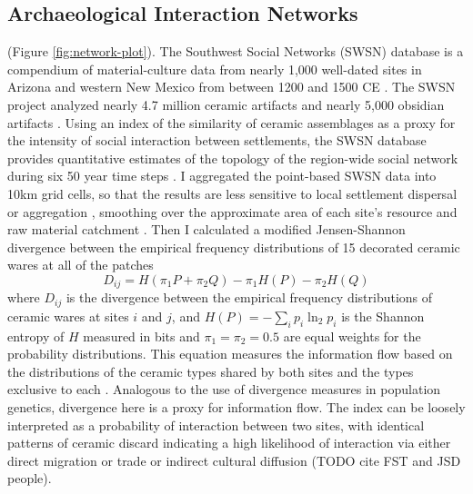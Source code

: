 \documentclass[10pt]{iopart}
\begin{document}
\subsection*{Archaeological Interaction Networks}
(Figure \ref{fig:network-plot}). The Southwest Social Networks (SWSN) database is a compendium of material-culture data from nearly 1,000 well-dated sites in Arizona and western New Mexico from between 1200 and 1500 CE \parencite{Mills2012,Mills2013a,Peeples2013,Borck2015,Hill2015,Mills2015a}. The SWSN project analyzed nearly 4.7 million ceramic artifacts and nearly 5,000 obsidian artifacts \parencite{Mills2015a}. Using an index of the similarity of ceramic assemblages as a proxy for the intensity of social interaction between settlements, the SWSN database provides quantitative estimates of the topology of the region-wide social network during six 50 year time steps \parencite{Mills2013a}. I aggregated the point-based SWSN data into 10km grid cells, so that the results are less sensitive to local settlement dispersal or aggregation \parencite{Paliou2016}, smoothing over the approximate area of each site's resource and raw material catchment \parencite{Varien1999}. Then I calculated a modified Jensen-Shannon divergence between the empirical frequency distributions of 15 decorated ceramic wares at all of the patches
\begin{equation}
    D_{ij} = H\left(\pi_1P + \pi_2Q\right) - \pi_1H(P) - \pi_2H(Q)
\end{equation}
where $D_{ij}$ is the divergence between the empirical frequency distributions of ceramic wares at sites $i$ and $j$, and $H(P) = -\sum_i p_i \ln_2 p_i$ is the Shannon entropy of $H$ measured in bits and $\pi_1 = \pi_2 = 0.5$ are equal weights for the probability distributions. This equation measures the information flow based on the distributions of the ceramic types shared by both sites and the types exclusive to each \parencite{Masucci2011,PaoloMasucci2012}. Analogous to the use of divergence measures in population genetics, divergence here is a proxy for information flow. The index can be loosely interpreted as a probability of interaction between two sites, with identical patterns of ceramic discard indicating a high likelihood of interaction via either direct migration or trade or indirect cultural diffusion (TODO cite FST and JSD people).
\end{document}

